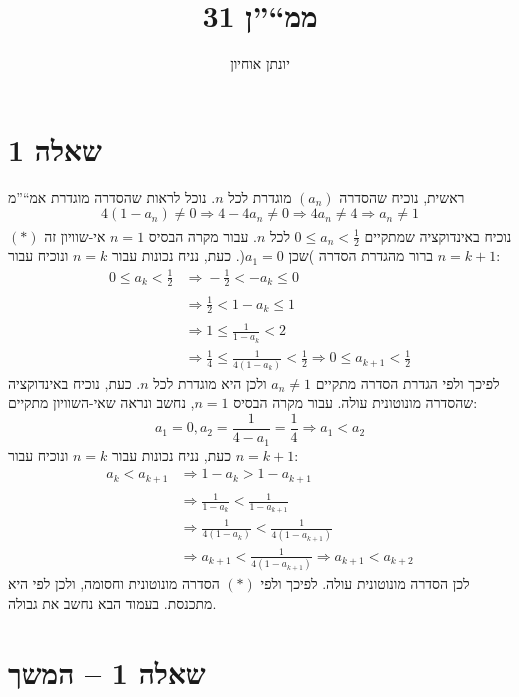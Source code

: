 \documentclass[11pt, oneside]{article}
\title{ממ``''ן 31}
\author{יונתן אוחיון}
\newcommand{\logr}[1]{\underset{\text{#1}}{\Rightarrow}}
\newcommand{\m}[3]{\R{משפט #2.#1#3}}
\begin{document}
\maketitle

\section*{שאלה 1}
ראשית, נוכיח שהסדרה $(a_{n})$ מוגדרת לכל $n$. נוכל לראות שהסדרה מוגדרת אמ``''מ
\[
4(1 - a_{n}) \neq 0
\logr{} 4 - 4a_{n} \neq 0
\logr{} 4a_{n} \neq 4
\logr{} a_{n} \neq 1
\]
$(*)$ נוכיח באינדוקציה שמתקיים $0 \le a_{n} < \frac{1}{2}$ לכל $n$. עבור מקרה הבסיס $n = 1$ אי-שוויון זה ברור מהגדרת הסדרה )שכן $a_{1} = 0$(. כעת, נניח נכונות עבור $n = k$ ונוכיח עבור $n = k + 1$:
\begin{align*}
0 \le a_{k} < \frac{1}{2}
& \logr{} -\frac{1}{2} < -a_{k} \le 0\\
& \logr{} \frac{1}{2} < 1 - a_{k} \le 1\\
& \logr{} 1 \le \frac{1}{1 - a_{k}} < 2\\
& \logr{} \frac{1}{4} \le \frac{1}{4(1 - a_{k})} < \frac{1}{2} \logr{} 0 \le a_{k + 1} < \frac{1}{2}
\end{align*}
לפיכך ולפי הגדרת הסדרה מתקיים $a_{n} \neq 1$ ולכן היא מוגדרת לכל $n$. כעת, נוכיח באינדוקציה שהסדרה מונוטונית עולה. עבור מקרה הבסיס $n = 1$, נחשב ונראה שאי-השוויון מתקיים:
\[
a_{1} = 0, a_{2} = \frac{1}{4 - a_{1}} = \frac{1}{4} \logr{} a_{1} < a_{2}
\]
כעת,  נניח נכונות עבור $n = k$ ונוכיח עבור $n = k + 1$:
\begin{align*}
a_{k} < a_{k + 1}
& \logr{} 1 - a_{k} > 1 - a_{k + 1}\\
& \logr{} \frac{1}{1 - a_{k}} < \frac{1}{1 - a_{k + 1}}\\
& \logr{} \frac{1}{4(1 - a_{k})} < \frac{1}{4(1 - a_{k + 1})}\\
& \logr{} a_{k + 1} < \frac{1}{4(1 - a_{k + 1})} \logr{} a_{k + 1} < a_{k + 2}
\end{align*}
לכן הסדרה מונוטונית עולה. לפיכך ולפי $(*)$ הסדרה מונוטונית וחסומה, ולכן לפי \m{3}{61}{} היא מתכנסת. בעמוד הבא נחשב את גבולה.
\clearpage
\section*{שאלה 1 -- המשך}
\end{document}
